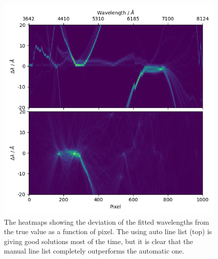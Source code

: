 \documentclass{aa}
\begin{document}
\begin{figure}[h]
    \centering
    \includegraphics[width=\columnwidth]{plots/figure_6_heatmap.png}
    \caption{The heatmaps showing the deviation of the fitted wavelengths from the true value as a function of pixel. The using auto line list (top) is giving good solutions most of the time, but it is clear that the manual line list completely outperforms the automatic one.}
    \label{fig:heatmap}
\end{figure}
\end{document}
